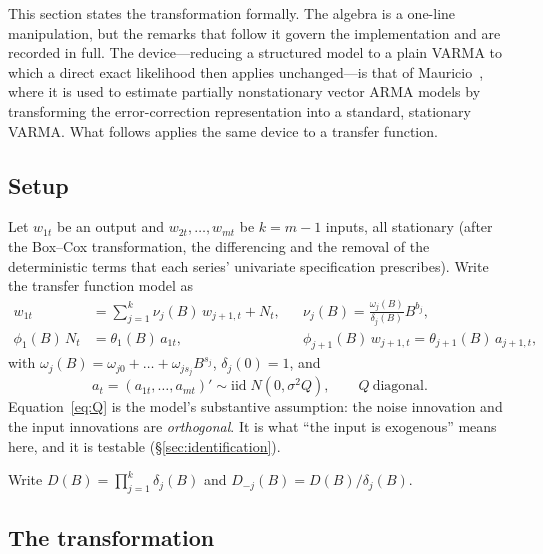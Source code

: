 \documentclass[11pt,a4paper]{article}
\theoremstyle{plain}
\theoremstyle{remark}
\begin{document}
This section states the transformation formally. The algebra is a one-line
manipulation, but the remarks that follow it govern the implementation and are
recorded in full. The device---reducing a structured model to a plain VARMA to which
a direct exact likelihood then applies unchanged---is that of
Mauricio~\cite{mauricio2006}, where it is used to estimate partially nonstationary
vector ARMA models by transforming the error-correction representation into a
standard, stationary VARMA. What follows applies the same device to a transfer
function.

\subsection{Setup}

Let $w_{1t}$ be an output and $w_{2t},\dots,w_{mt}$ be $k=m-1$ inputs, all
stationary (after the Box--Cox transformation, the differencing and the removal of
the deterministic terms that each series' univariate specification prescribes).
Write the transfer function model as
\begin{align}
w_{1t} &= \sum_{j=1}^{k}\nu_j(B)\,w_{j+1,t} + N_t,
&& \nu_j(B)=\frac{\omega_j(B)}{\delta_j(B)}B^{b_j},
\label{eq:tfm}\\
\phi_1(B)\,N_t &= \theta_1(B)\,a_{1t},
&& \phi_{j+1}(B)\,w_{j+1,t}=\theta_{j+1}(B)\,a_{j+1,t},
\label{eq:arma}
\end{align}
with $\omega_j(B)=\omega_{j0}+\dots+\omega_{js_j}B^{s_j}$, $\delta_j(0)=1$, and
\begin{equation}
a_t=(a_{1t},\dots,a_{mt})' \sim \mathrm{iid}\; N(0,\sigma^2 Q),
\qquad Q \ \text{diagonal}.
\label{eq:Q}
\end{equation}
Equation~\eqref{eq:Q} is the model's substantive assumption: the noise innovation and
the input innovations are \emph{orthogonal}. It is what ``the input is exogenous''
means here, and it is testable (\S\ref{sec:identification}).

Write $D(B)=\prod_{j=1}^{k}\delta_j(B)$ and $D_{-j}(B)=D(B)/\delta_j(B)$.

\subsection{The transformation}
\end{document}
